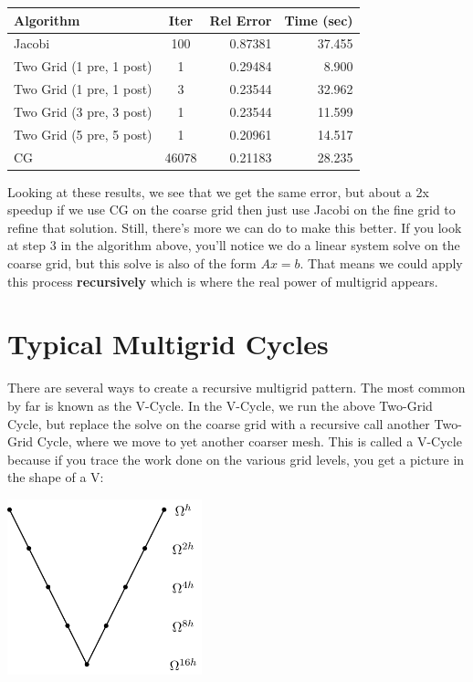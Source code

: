 \documentclass[11pt]{article}
\begin{document}
\begin{center}
\begin{tabular}{lcrr}
  Algorithm & Iter & Rel Error & Time (sec) \\
  \hline
  Jacobi                   & 100   &  0.87381  & 37.455 \\
  Two Grid (1 pre, 1 post) & 1	   &  0.29484  &  8.900 \\
  Two Grid (1 pre, 1 post) & 3	   &  0.23544  & 32.962 \\
  Two Grid (3 pre, 3 post) & 1	   &  0.23544  & 11.599 \\
  Two Grid (5 pre, 5 post) & 1     &  0.20961  & 14.517 \\
  CG                       & 46078 &  0.21183  & 28.235
\end{tabular}
\end{center}    

    
    Looking at these results, we see that we get the same error, but about a
2x speedup if we use CG on the coarse grid then just use Jacobi on the
fine grid to refine that solution. Still, there's more we can do to make
this better. If you look at step 3 in the algorithm above, you'll notice
we do a linear system solve on the coarse grid, but this solve is also
of the form \(Ax = b\). That means we could apply this process
\textbf{recursively} which is where the real power of multigrid appears.

    \hypertarget{typical-multigrid-cycles}{%
\section{Typical Multigrid Cycles}\label{typical-multigrid-cycles}}

There are several ways to create a recursive multigrid pattern. The most
common by far is known as the V-Cycle. In the V-Cycle, we
run the above Two-Grid Cycle, but replace the solve on the coarse grid
with a recursive call another Two-Grid Cycle, where we move to yet
another coarser mesh. This is called a V-Cycle because if you trace the
work done on the various grid levels, you get a picture in the shape of
a V:
\begin{center}
  \includegraphics[height=2in]{../Graphics/V-Cycle-Graphic.png}
\end{center}
\end{document}
